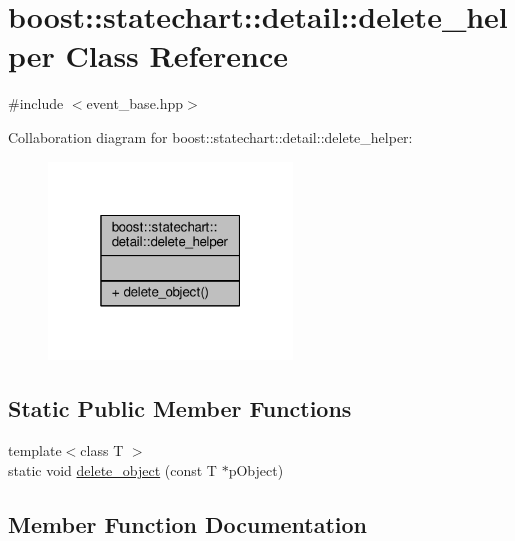 \hypertarget{classboost_1_1statechart_1_1detail_1_1delete__helper}{}\section{boost\+:\+:statechart\+:\+:detail\+:\+:delete\+\_\+helper Class Reference}
\label{classboost_1_1statechart_1_1detail_1_1delete__helper}


{\ttfamily \#include $<$event\+\_\+base.\+hpp$>$}



Collaboration diagram for boost\+:\+:statechart\+:\+:detail\+:\+:delete\+\_\+helper\+:
\nopagebreak
\begin{figure}[H]
\begin{center}
\leavevmode
\includegraphics[width=184pt]{classboost_1_1statechart_1_1detail_1_1delete__helper__coll__graph}
\end{center}
\end{figure}
\subsection*{Static Public Member Functions}
\begin{DoxyCompactItemize}
\item 
{\footnotesize template$<$class T $>$ }\\static void \mbox{\hyperlink{classboost_1_1statechart_1_1detail_1_1delete__helper_a473a6fc721b85016da9976e59aac399c}{delete\+\_\+object}} (const T $\ast$p\+Object)
\end{DoxyCompactItemize}


\subsection{Member Function Documentation}
\mbox{\label{classboost_1_1statechart_1_1detail_1_1delete__helper_a473a6fc721b85016da9976e59aac399c}} 
